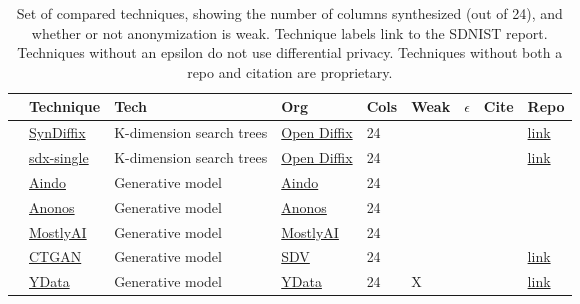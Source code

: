 \begin{table}
    \centering
    \caption{Set of compared techniques, showing the number of columns synthesized (out of 24), and whether or not anonymization is weak. Technique labels link to the SDNIST report. Techniques without an epsilon do not use differential privacy. Techniques without both a repo and citation are proprietary.}
    \label{tab:infotable}
    \begin{tabular}{lllllllll}
        \toprule
          & Technique & Tech & Org & Cols & Weak & \thinspace$\epsilon$\qquad\qquad & Cite & Repo \\
        \midrule
        \cellcolor{blue} & \href{https://htmlpreview.github.io/?https://github.com/yoid2000/sdnist-summary/blob/main/results/syndiffix_all/report.html}{SynDiffix} & K-dimension search trees & \href{https://www.open-diffix.org/}{Open Diffix} & 24 &   &  & \cite{francis2023syndiffix} & \href{https://github.com/diffix/syndiffix}{link} \\
        \cellcolor{blue} & \href{https://htmlpreview.github.io/?https://github.com/yoid2000/sdnist-summary/blob/main/results/sdx_single/report.html}{sdx-single} & K-dimension search trees & \href{https://www.open-diffix.org/}{Open Diffix} & 24 &   &  & \cite{francis2023syndiffix} & \href{https://github.com/diffix/syndiffix}{link} \\
        \cellcolor{red} & \href{https://htmlpreview.github.io/?https://github.com/yoid2000/sdnist-summary/blob/main/results/aindo_synth/report.html}{Aindo} & Generative model & \href{https://www.aindo.com/}{Aindo} & 24 &   &  &  &  \\
        \cellcolor{red} & \href{https://htmlpreview.github.io/?https://github.com/yoid2000/sdnist-summary/blob/main/results/anonos_sdk/report.html}{Anonos} & Generative model & \href{https://www.anonos.com/}{Anonos} & 24 &   &  &  &  \\
        \cellcolor{red} & \href{https://htmlpreview.github.io/?https://github.com/yoid2000/sdnist-summary/blob/main/results/mostlyai_sd_platform/report.html}{MostlyAI} & Generative model & \href{https://mostly.ai/}{MostlyAI} & 24 &   &  &  &  \\
        \cellcolor{red} & \href{https://htmlpreview.github.io/?https://github.com/yoid2000/sdnist-summary/blob/main/results/sdv_ctgan_epochs1000/report.html}{CTGAN} & Generative model & \href{https://sdv.dev/}{SDV} & 24 &   &  & \cite{xu2019modeling} & \href{https://github.com/sdv-dev/SDV}{link} \\
        \cellcolor{pink} & \href{https://htmlpreview.github.io/?https://github.com/yoid2000/sdnist-summary/blob/main/results/ydata_fabric_synthesizers/report.html}{YData} & Generative model & \href{https://ydata.ai/}{YData} & 24 & X &  &  & \href{https://github.com/ydataai/ydata-synthetic}{link} \\

\end{tabular}
\end{table}
